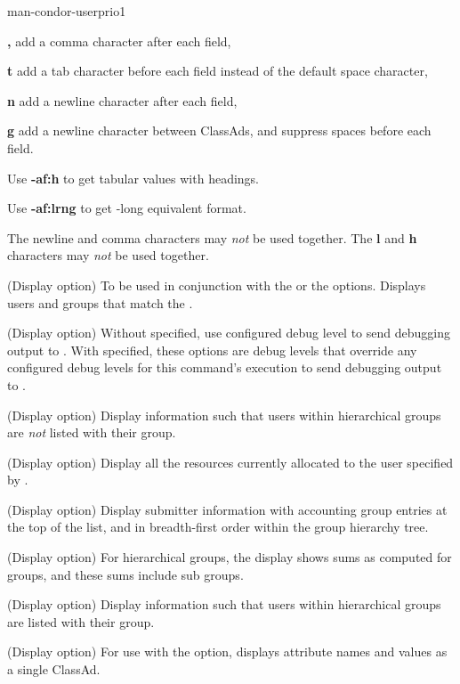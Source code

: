 \begin{ManPage}{}{man-condor-userprio}{1}
\begin{Options}
{    \textbf{,} add a comma character after each field,

    \textbf{t} add a tab character before each field instead of 
    the default space character,

    \textbf{n} add a newline character after each field,

    \textbf{g} add a newline character between ClassAds, and
    suppress spaces before each field.

    Use \textbf{-af:h} to get tabular values with headings.

    Use \textbf{-af:lrng} to get -long equivalent format.

    The newline and comma characters may \emph{not} be used together.
    The \textbf{l} and \textbf{h} characters may \emph{not} be used
    together.
    }

  {(Display option) To be used in conjunction with the  
   or the  options.
  Displays users and groups that match the . }

  {(Display option) Without  specified, 
  use configured debug level to send debugging output to .
  With  specified, these options are debug levels that
  override any configured debug levels for this command's execution
  to send debugging output to .}

  {(Display option) Display information such that users within hierarchical
  groups are \emph{not} listed with their group. }

  {(Display option) Display all the resources currently allocated to the 
  user specified by .  }

  {(Display option) Display submitter information with accounting group
   entries at the top of the list, 
   and in breadth-first order within the group hierarchy tree.}

  {(Display option) For hierarchical groups,
  the display shows sums as computed for groups, 
  and these sums include sub groups.  }

  {(Display option) Display information such that users within hierarchical
  groups are listed with their group. }

  {(Display option) For use with the  option,
  displays attribute names and values as a single ClassAd. }


\end{Options}
\end{ManPage}
